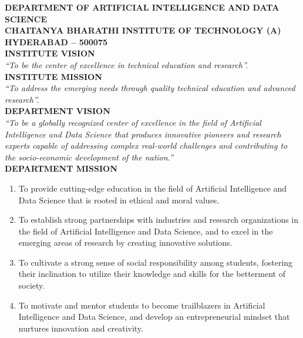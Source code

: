 \documentclass[12pt,a4paper]{report}
\begin{document}
\setcounter{page}{2}

\newpage
\begin{center}
    \vspace{0.4cm}
    
    \textbf{\large DEPARTMENT OF ARTIFICIAL INTELLIGENCE AND DATA SCIENCE}\\[0.1cm]
    \textbf{\large CHAITANYA BHARATHI INSTITUTE OF TECHNOLOGY (A)}\\[0.1cm]
    \textbf{\large HYDERABAD -- 500075}\\[1.0cm]
    
    \textbf{\Large INSTITUTE VISION}\\[0.4cm]
    \textit{``To be the center of excellence in technical education and research''.}\\[1.0cm]
    
    \textbf{\Large INSTITUTE MISSION}\\[0.4cm]
    \textit{``To address the emerging needs through quality technical education and advanced research''.}\\[1.2cm]
    
    \textbf{\Large DEPARTMENT VISION}\\[0.4cm]
    \textit{``To be a globally recognized center of excellence in the field of Artificial Intelligence and Data Science that produces innovative pioneers and research experts capable of addressing complex real-world challenges and contributing to the socio-economic development of the nation.''}\\[1.0cm]
    
    \textbf{\Large DEPARTMENT MISSION}\\[0.4cm]
\end{center}

\begin{enumerate}[label=\textbf{\arabic*.}]
    \item To provide cutting-edge education in the field of Artificial Intelligence and Data Science that is rooted in ethical and moral values.
    \item To establish strong partnerships with industries and research organizations in the field of Artificial Intelligence and Data Science, and to excel in the emerging areas of research by creating innovative solutions.
    \item To cultivate a strong sense of social responsibility among students, fostering their inclination to utilize their knowledge and skills for the betterment of society.
    \item To motivate and mentor students to become trailblazers in Artificial Intelligence and Data Science, and develop an entrepreneurial mindset that nurtures innovation and creativity.
\end{enumerate}
\end{document}
